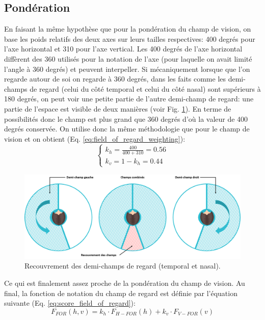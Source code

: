 	\subsection{Pondération}
	\par En faisant la même hypothèse que pour la pondération du champ de vision, on base les poids relatifs des deux axes sur leurs tailles respectives: 400 degrés pour l'axe horizontal et 310 pour l'axe vertical. Les 400 degrés de l'axe horizontal diffèrent des 360 utilisés pour la notation de l'axe (pour laquelle on avait limité l'angle à 360 degrés) et peuvent interpeller. Si mécaniquement lorsque que l'on regarde autour de soi on regarde à 360 degrés, dans les faits comme les demi-champs de regard (celui du côté temporal et celui du côté nasal) sont supérieurs à 180 degrés, on peut voir une petite partie de l'autre demi-champ de regard: une partie de l'espace est visible de deux manières (voir Fig. \ref{fig:demi_champs_regard}). En terme de possibilités donc le champ est plus grand que 360 degrés d'où la valeur de 400 degrés conservée. On utilise donc la même méthodologie que pour le champ de vision et on obtient (Eq. \ref{eq:field_of_regard_weighting}):
	\begin{equation}
	\begin{cases}
		k_h = \frac{400}{400 + 310} = 0.56\\
		k_v = 1 - k_h = 0.44
	\end{cases}
	\label{eq:field_of_regard_weighting}
	\end{equation}
	
	\begin{figure}
		\centering
		\includegraphics[scale=.35]{Figures/RecouvrementFOR}
		\caption{Recouvrement des demi-champs de regard (temporal et nasal).}
		\label{fig:demi_champs_regard}
	\end{figure}
	
	\par Ce qui est finalement assez proche de la pondération du champ de vision. Au final, la fonction de notation du champ de regard est définie par l'équation suivante (Eq. \ref{eq:score_field_of_regard}):
	\begin{equation}
	F_{FOR}(h,v) = k_h \cdot F_{H-FOR}(h) + k_v \cdot F_{V-FOR}(v)
	\label{eq:score_field_of_regard}
	\end{equation}
	
